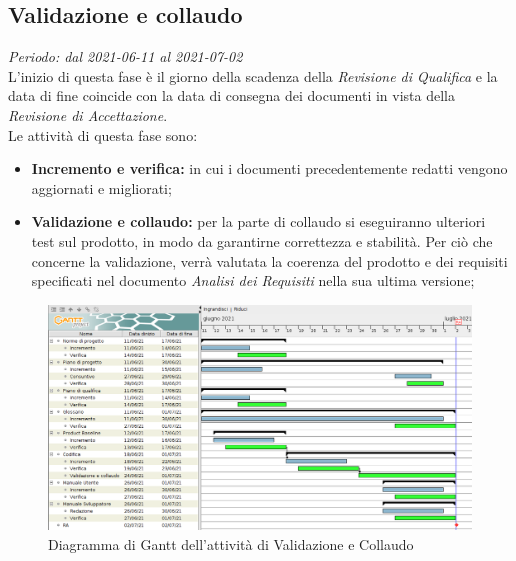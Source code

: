 \subsection{Validazione e collaudo}
\textit{Periodo: dal 2021-06-11 al 2021-07-02}\\
L'inizio di questa fase è il giorno della scadenza della \textit{Revisione di Qualifica} e la data di fine coincide con la data di consegna dei documenti in vista della \textit{Revisione di Accettazione}.\\
Le attività di questa fase sono:
\begin{itemize}
    \item \textbf{Incremento e verifica:} in cui i documenti precedentemente redatti vengono aggiornati e migliorati;
    \item \textbf{Validazione e collaudo:} per la parte di collaudo si eseguiranno ulteriori test sul prodotto, in modo da garantirne correttezza e stabilità. Per ciò che concerne la validazione, verrà valutata la coerenza del prodotto e dei requisiti specificati nel documento \textit{Analisi dei Requisiti} nella sua ultima versione;
\end{itemize}
\begin{figure}[!ht]
    \caption{Diagramma di Gantt dell'attività di Validazione e Collaudo}
    \vspace{5px}
    \includegraphics[scale=0.3]{../../../Images/Diagrammi/Gantt/validazione_v2.png}
    \centering
\end{figure}